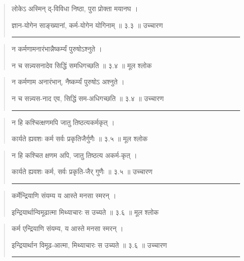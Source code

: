 \begin{quotation}

लोकेऽ अस्मिन् द्-विविधा निष्ठा, पुरा प्रोक्ता मयानघ  ।  

ज्ञान-योगेन साङ्‍ख्यानां, कर्म-योगेन योगिनाम्‌  ॥ ३.३ ॥  उच्चारण

\noindent\rule{16cm}{0.4pt} 
\end{quotation}


\begin{quotation}

न कर्मणामनारंभान्नैष्कर्म्यं पुरुषोऽश्नुते  ।  

न च सन्न्यसनादेव सिद्धिं समधिगच्छति  ॥ ३.४ ॥  मूल श्लोक
\end{quotation}

\begin{quotation}

न कर्मणाम अनारंभान्, नैष्कर्म्यं पुरुषोऽ अश्नुते ।  

न च सन्न्यस-नाद एव, सिद्धिं सम-अधिगच्छति  ॥ ३.४ ॥  उच्चारण

\noindent\rule{16cm}{0.4pt} 
\end{quotation}


\begin{quotation}

न हि कश्चित्क्षणमपि जातु तिष्ठत्यकर्मकृत्‌  ।  

कार्यते ह्यवशः कर्म सर्वः प्रकृतिजैर्गुणैः  ॥ ३.५ ॥  मूल श्लोक
\end{quotation}

\begin{quotation}
न हि कश्चित क्षणम अपि, जातु तिष्ठत्य अकर्म-कृत्‌  ।  

कार्यते ह्यवशः कर्म, सर्वः प्रकृति-जैर् गुणैः  ॥ ३.५ ॥  उच्चारण

\noindent\rule{16cm}{0.4pt} 
\end{quotation}


\begin{quotation}

कर्मेन्द्रियाणि संयम्य य आस्ते मनसा स्मरन्‌  ।  

इन्द्रियार्थान्विमूढात्मा मिथ्याचारः स उच्यते  ॥ ३.६ ॥  मूल श्लोक
\end{quotation}

\begin{quotation}

कर्म एन्द्रियाणि संयम्य, य आस्ते मनसा स्मरन्‌  ।  

इन्द्रियार्थान विमूढ-आत्मा, मिथ्याचारः स उच्यते  ॥ ३.६ ॥  उच्चारण

\noindent\rule{16cm}{0.4pt} 
\end{quotation}


